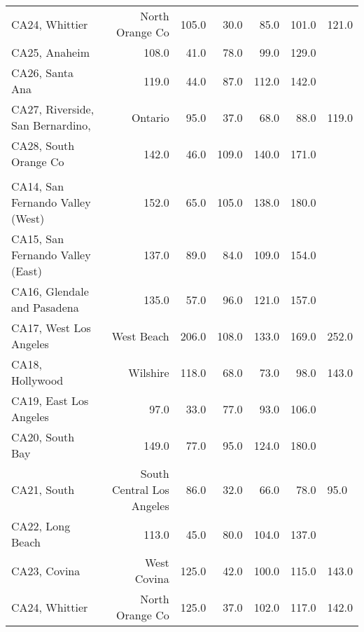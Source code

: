 \begin{longtable}[l]{l|rrrrr}
\hspace{1em}CA24, Whittier & North Orange Co & 105.0 & 30.0 & 85.0 & 101.0 & 121.0\\
\hspace{1em}CA25, Anaheim & 108.0 & 41.0 & 78.0 & 99.0 & 129.0\\
\hspace{1em}CA26, Santa Ana & 119.0 & 44.0 & 87.0 & 112.0 & 142.0\\
\hspace{1em}CA27, Riverside, San Bernardino, & Ontario & 95.0 & 37.0 & 68.0 & 88.0 & 119.0\\
\hspace{1em}CA28, South Orange Co & 142.0 & 46.0 & 109.0 & 140.0 & 171.0\\
\addlinespace[0.5em]
\\
\hspace{1em}CA14, San Fernando Valley (West) & 152.0 & 65.0 & 105.0 & 138.0 & 180.0\\
\hspace{1em}CA15, San Fernando Valley (East) & 137.0 & 89.0 & 84.0 & 109.0 & 154.0\\
\hspace{1em}CA16, Glendale and Pasadena & 135.0 & 57.0 & 96.0 & 121.0 & 157.0\\
\hspace{1em}CA17, West Los Angeles & West Beach & 206.0 & 108.0 & 133.0 & 169.0 & 252.0\\
\hspace{1em}CA18, Hollywood & Wilshire & 118.0 & 68.0 & 73.0 & 98.0 & 143.0\\
\hspace{1em}CA19, East Los Angeles & 97.0 & 33.0 & 77.0 & 93.0 & 106.0\\
\hspace{1em}CA20, South Bay & 149.0 & 77.0 & 95.0 & 124.0 & 180.0\\
\hspace{1em}CA21, South & South Central Los Angeles & 86.0 & 32.0 & 66.0 & 78.0 & 95.0\\
\hspace{1em}CA22, Long Beach & 113.0 & 45.0 & 80.0 & 104.0 & 137.0\\
\hspace{1em}CA23, Covina & West Covina & 125.0 & 42.0 & 100.0 & 115.0 & 143.0\\
\hspace{1em}CA24, Whittier & North Orange Co & 125.0 & 37.0 & 102.0 & 117.0 & 142.0\\

\end{longtable}
